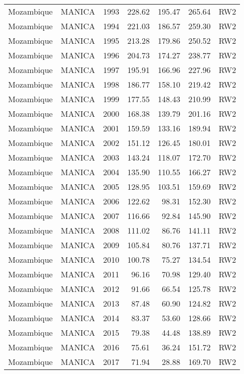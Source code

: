 \begin{longtable}{lllrrrl}
  Mozambique & MANICA & 1993 & 228.62 & 195.47 & 265.64 & RW2 \\ 
  Mozambique & MANICA & 1994 & 221.03 & 186.57 & 259.30 & RW2 \\ 
  Mozambique & MANICA & 1995 & 213.28 & 179.86 & 250.52 & RW2 \\ 
  Mozambique & MANICA & 1996 & 204.73 & 174.27 & 238.77 & RW2 \\ 
  Mozambique & MANICA & 1997 & 195.91 & 166.96 & 227.96 & RW2 \\ 
  Mozambique & MANICA & 1998 & 186.77 & 158.10 & 219.42 & RW2 \\ 
  Mozambique & MANICA & 1999 & 177.55 & 148.43 & 210.99 & RW2 \\ 
  Mozambique & MANICA & 2000 & 168.38 & 139.79 & 201.16 & RW2 \\ 
  Mozambique & MANICA & 2001 & 159.59 & 133.16 & 189.94 & RW2 \\ 
  Mozambique & MANICA & 2002 & 151.12 & 126.45 & 180.01 & RW2 \\ 
  Mozambique & MANICA & 2003 & 143.24 & 118.07 & 172.70 & RW2 \\ 
  Mozambique & MANICA & 2004 & 135.90 & 110.55 & 166.27 & RW2 \\ 
  Mozambique & MANICA & 2005 & 128.95 & 103.51 & 159.69 & RW2 \\ 
  Mozambique & MANICA & 2006 & 122.62 & 98.31 & 152.30 & RW2 \\ 
  Mozambique & MANICA & 2007 & 116.66 & 92.84 & 145.90 & RW2 \\ 
  Mozambique & MANICA & 2008 & 111.02 & 86.76 & 141.11 & RW2 \\ 
  Mozambique & MANICA & 2009 & 105.84 & 80.76 & 137.71 & RW2 \\ 
  Mozambique & MANICA & 2010 & 100.78 & 75.27 & 134.54 & RW2 \\ 
  Mozambique & MANICA & 2011 & 96.16 & 70.98 & 129.40 & RW2 \\ 
  Mozambique & MANICA & 2012 & 91.66 & 66.54 & 125.78 & RW2 \\ 
  Mozambique & MANICA & 2013 & 87.48 & 60.90 & 124.82 & RW2 \\ 
  Mozambique & MANICA & 2014 & 83.37 & 53.60 & 128.66 & RW2 \\ 
  Mozambique & MANICA & 2015 & 79.38 & 44.48 & 138.89 & RW2 \\ 
  Mozambique & MANICA & 2016 & 75.61 & 36.24 & 151.72 & RW2 \\ 
  Mozambique & MANICA & 2017 & 71.94 & 28.88 & 169.70 & RW2 \\ 

\end{longtable}
